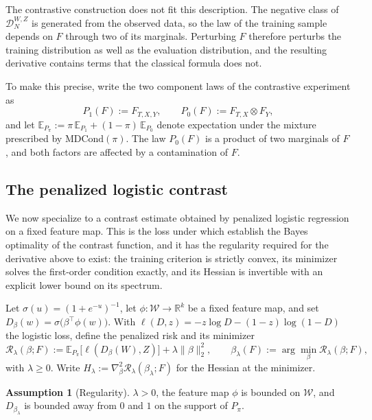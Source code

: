 \documentclass[11pt]{article}
\theoremstyle{plain}
\theoremstyle{definition}
\newtheorem{assumption}{Assumption}
\theoremstyle{remark}
\newcommand{\MDC}{\ensuremath{\text{MDCond}}}
\newcommand{\pE}{\ensuremath{\mathbb{E}}}
\newcommand{\R}{\mathbb{R}}
\newcommand{\cW}{\ensuremath{\mathcal{W}}}
\newcommand{\cR}{\ensuremath{\mathcal{R}}}
\newcommand{\ratio}{\ensuremath{\pi}}
\newcommand{\mDwz}[1]{\ensuremath{\mathcal{D}}_{#1}^{W,Z}}
\newcommand{\ks}{k}
\begin{document}
The contrastive construction does not fit this description. The negative class of
$\mDwz{N}$ is generated from the observed data, so the law of the training sample depends
on $F$ through two of its marginals. Perturbing $F$ therefore perturbs the training
distribution as well as the evaluation distribution, and the resulting derivative
contains terms that the classical formula does not.

To make this precise, write the two component laws of the contrastive experiment as
\begin{equation}
P_1(F) := F_{T,X,Y}, \qquad
P_0(F) := F_{T,X} \otimes F_Y ,
\label{eq:laws}
\end{equation}
and let $\pE_{P_\ratio} := \ratio\,\pE_{P_1} + (1-\ratio)\,\pE_{P_0}$ denote expectation
under the mixture prescribed by $\MDC(\ratio)$. The law $P_0(F)$ is a product of two
marginals of $F$, and both factors are affected by a contamination of $F$.

\subsection{The penalized logistic contrast}
\label{sec:mcd-logistic}

We now specialize to a contrast estimate obtained by penalized logistic regression on a
fixed feature map. This is the loss under which \citet{meziani2025mcd} establish the
Bayes optimality of the contrast function, and it has the regularity required for the
derivative above to exist: the training criterion is strictly convex, its minimizer
solves the first-order condition exactly, and its Hessian is invertible with an explicit
lower bound on its spectrum.

Let $\sigma(u) = (1+e^{-u})^{-1}$, let $\phi : \cW \to \R^{\ks}$ be a fixed feature map,
and set $D_\beta(w) = \sigma\big(\beta^\top \phi(w)\big)$. With
$\ell(D,z) = -z\log D - (1-z)\log(1-D)$ the logistic loss, define the penalized risk and
its minimizer
\begin{equation}
\cR_\lambda(\beta;F) := \pE_{P_\ratio}\big[\ell(D_\beta(W),Z)\big]
+ \lambda \|\beta\|_2^2 ,
\qquad
\beta_\lambda(F) := \arg\min_{\beta} \cR_\lambda(\beta;F),
\label{eq:criterion}
\end{equation}
with $\lambda \ge 0$. Write $H_\lambda := \nabla^2_\beta \cR_\lambda(\beta_\lambda;F)$
for the Hessian at the minimizer.

\begin{assumption}[Regularity]
\label{as:smooth}
$\lambda > 0$, the feature map $\phi$ is bounded on $\cW$, and $D_{\beta_\lambda}$ is
bounded away from $0$ and $1$ on the support of $P_\ratio$.
\end{assumption}
\end{document}
